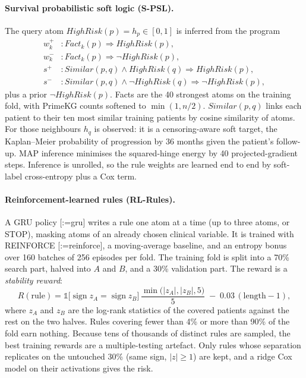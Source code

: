 \documentclass{mnnit}
\makeatletter
\newcommand{\rc}[1]{[\def\rc@sep{}\@for\rc@key:=#1\do{\rc@sep\ref{ref:\rc@key}\def\rc@sep{, }}]}
\makeatother
\begin{document}
\paragraph{Survival probabilistic soft logic (S-PSL).} The query atom $\mathit{HighRisk}(p) = h_p \in [0,1]$ is
inferred from the program
\begin{align}
  w^+_k &: \mathit{Fact}_k(p) \Rightarrow \mathit{HighRisk}(p), \nonumber\\
  w^-_k &: \mathit{Fact}_k(p) \Rightarrow \neg\mathit{HighRisk}(p), \nonumber\\
  s^+ &: \mathit{Similar}(p,q) \wedge \mathit{HighRisk}(q) \Rightarrow \mathit{HighRisk}(p), \nonumber\\
  s^- &: \mathit{Similar}(p,q) \wedge \neg\mathit{HighRisk}(q) \Rightarrow \neg\mathit{HighRisk}(p),
\end{align}
plus a prior $\neg\mathit{HighRisk}(p)$. Facts are the 40 strongest atoms on the training fold, with PrimeKG
counts softened to $\min(1, n/2)$. $\mathit{Similar}(p,q)$ links each patient to their ten most similar training
patients by cosine similarity of atoms. For those neighbours $h_q$ is observed: it is a censoring-aware soft target,
the Kaplan--Meier probability of progression by 36 months given the patient's follow-up. MAP inference minimises
the squared-hinge energy by 40 projected-gradient steps. Inference is unrolled, so the rule weights are learned end
to end by soft-label cross-entropy plus a Cox term.

\paragraph{Reinforcement-learned rules (RL-Rules).} A GRU policy \rc{gru} writes a rule one atom at a time (up to
three atoms, or STOP), masking atoms of an already chosen clinical variable. It is trained with REINFORCE
\rc{reinforce}, a moving-average baseline, and an entropy bonus over 160 batches of 256 episodes per fold. The
training fold is split into a 70\% search part, halved into $A$ and $B$, and a 30\% validation part. The reward is
a \emph{stability reward}:
\begin{equation}
  R(\text{rule}) = \mathbb{1}\big[\operatorname{sign} z_A = \operatorname{sign} z_B\big]\,
  \frac{\min\!\big(|z_A|, |z_B|, 5\big)}{5} \;-\; 0.03\,(\text{length} - 1),
\end{equation}
where $z_A$ and $z_B$ are the log-rank statistics of the covered patients against the rest on the two halves.
Rules covering fewer than 4\% or more than 90\% of the fold earn nothing. Because tens of thousands of distinct rules
are sampled, the best training rewards are a multiple-testing artefact. Only rules whose separation replicates on the
untouched 30\% (same sign, $|z| \ge 1$) are kept, and a ridge Cox model on their activations gives the risk.
\end{document}

